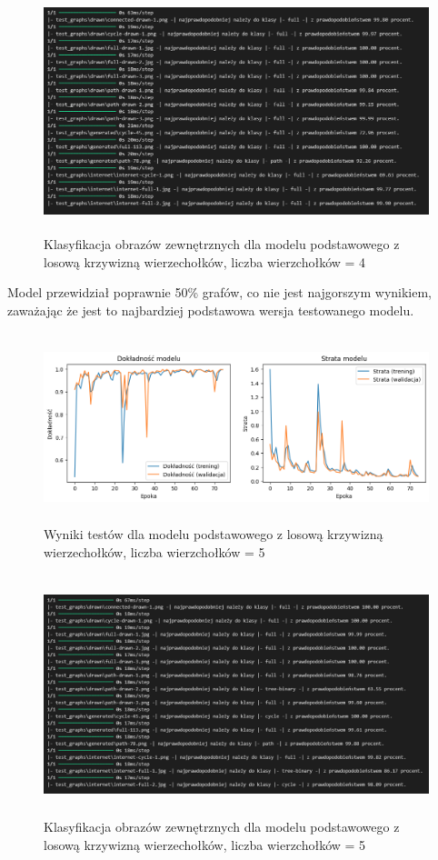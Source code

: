 \begin{figure}[ht]
	\centering
	\includegraphics[height=7cm]{resources/tests/images/v3/base4_txt.png}
	\caption{Klasyfikacja obrazów zewnętrznych dla modelu podstawowego z losową krzywizną wierzechołków, liczba wierzchołków = 4}
	\label{Fig:tests-base-2}
\end{figure}
\FloatBarrier

Model przewidział poprawnie 50\% grafów, co nie jest najgorszym wynikiem,
zaważając że jest to najbardziej podstawowa wersja testowanego modelu.

\begin{figure}[ht]
	\centering
	\includegraphics[height=5.5cm]{resources/tests/images/v3/base5_img.png}
	\caption{Wyniki testów dla modelu podstawowego z losową krzywizną wierzechołków, liczba wierzchołków = 5}
	\label{Fig:tests-base-1}
\end{figure}
\FloatBarrier

\begin{figure}[ht]
	\centering
	\includegraphics[height=7cm]{resources/tests/images/v3/base5_txt.png}
	\caption{Klasyfikacja obrazów zewnętrznych dla modelu podstawowego z losową krzywizną wierzechołków, liczba wierzchołków = 5}
	\label{Fig:tests-base-2}
\end{figure}
\FloatBarrier

